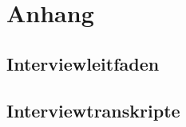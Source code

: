 
\chapter{Anhang}
\label{chap:anhang}



\section{Interviewleitfaden}
\label{sec:interviewleitfaden}


%


\section{Interviewtranskripte}
\label{sec:transkripte}

% 

